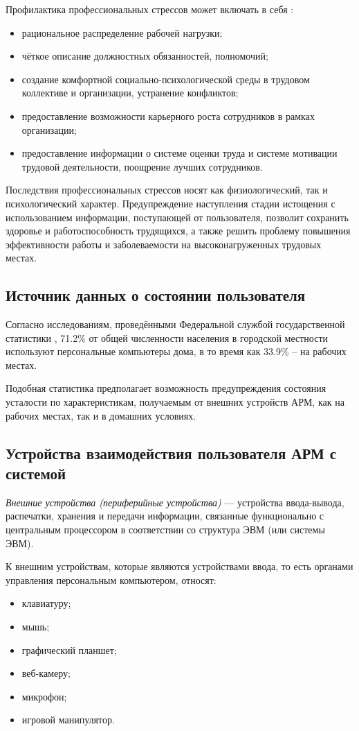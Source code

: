 Профилактика профессиональных стрессов может включать в себя \cite{professionalStress}:
\begin{itemize}[leftmargin=1.6\parindent]
\item рациональное распределение рабочей нагрузки;
\item чёткое описание должностных обязанностей, полномочий;
\item создание комфортной социально-психологической среды в трудовом коллективе и организации, устранение конфликтов;
\item предоставление возможности карьерного роста сотрудников в рамках организации;
\item предоставление информации о системе оценки труда и системе мотивации трудовой деятельности, поощрение лучших сотрудников.
\end{itemize}

Последствия профессиональных стрессов носят как физиологический, так и психологический характер. Предупреждение наступления стадии истощения с использованием информации, поступающей от пользователя, позволит сохранить здоровье и работоспособность трудящихся, а также решить проблему повышения эффективности работы и заболеваемости на высоконагруженных трудовых местах.

\subsection{Источник данных о состоянии пользователя}
Согласно исследованиям, проведёнными Федеральной службой государственной статистики \cite{rosstatInvestigation}, 71.2\% от общей численности населения в городской местности используют персональные компьютеры дома, в то время как 33.9\% -- на рабочих местах.

Подобная статистика предполагает возможность предупреждения состояния усталости по характеристикам, получаемым от внешних устройств АРМ, как на рабочих местах, так и в домашних условиях.

\subsection{Устройства взаимодействия пользователя АРМ с системой}
\textit{Внешние устройства (периферийные устройства)} --- устройства ввода-вывода, распечатки, хранения и передачи информации, связанные функционально с центральным процессором в соответствии со структура ЭВМ (или системы ЭВМ). \cite{encDic}

К внешним устройствам, которые являются устройствами ввода, то есть органами управления персональным компьютером, относят:
\begin{itemize}[leftmargin=1.6\parindent]
\item клавиатуру;
\item мышь;
\item графический планшет;
\item веб-камеру;
\item микрофон;
\item игровой манипулятор.
\end{itemize}

